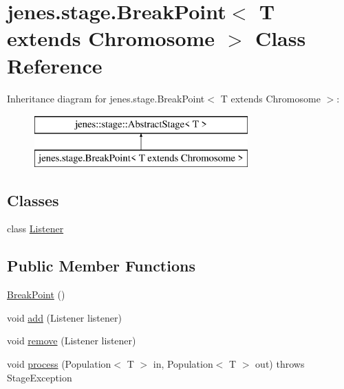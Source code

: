 \hypertarget{classjenes_1_1stage_1_1_break_point_3_01_t_01extends_01_chromosome_01_4}{\section{jenes.\-stage.\-Break\-Point$<$ T extends Chromosome $>$ Class Reference}
\label{classjenes_1_1stage_1_1_break_point_3_01_t_01extends_01_chromosome_01_4}
}
Inheritance diagram for jenes.\-stage.\-Break\-Point$<$ T extends Chromosome $>$\-:\begin{figure}[H]
\begin{center}
\leavevmode
\includegraphics[height=2.000000cm]{classjenes_1_1stage_1_1_break_point_3_01_t_01extends_01_chromosome_01_4}
\end{center}
\end{figure}
\subsection*{Classes}
\begin{DoxyCompactItemize}
\item 
class \hyperlink{classjenes_1_1stage_1_1_break_point_3_01_t_01extends_01_chromosome_01_4_1_1_listener}{Listener}
\end{DoxyCompactItemize}
\subsection*{Public Member Functions}
\begin{DoxyCompactItemize}
\item 
\hyperlink{classjenes_1_1stage_1_1_break_point_3_01_t_01extends_01_chromosome_01_4_a242b4e33e148a17a0f2d19e1963aa990}{Break\-Point} ()
\item 
void \hyperlink{classjenes_1_1stage_1_1_break_point_3_01_t_01extends_01_chromosome_01_4_aac70bbcb2e82710fe969bf1545c3a9f4}{add} (Listener listener)
\item 
void \hyperlink{classjenes_1_1stage_1_1_break_point_3_01_t_01extends_01_chromosome_01_4_a367d07e34b42c06b692ec35d0a8f8a40}{remove} (Listener listener)
\item 
void \hyperlink{classjenes_1_1stage_1_1_break_point_3_01_t_01extends_01_chromosome_01_4_a2fa0c075727e667e633bb9d3eb2b9e71}{process} (Population$<$ T $>$ in, Population$<$ T $>$ out)  throws Stage\-Exception 
\end{DoxyCompactItemize}
